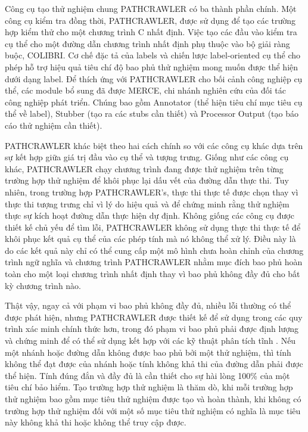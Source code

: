 \documentclass[12pt,a4paper]{report}
\begin{document}
Công cụ tạo thử nghiệm chung PATHCRAWLER có ba thành phần chính. Một công cụ kiểm tra đồng thời, PATHCRAWLER, được sử dụng để tạo các trường hợp kiểm thử cho một chương trình C nhất định. Việc tạo các đầu vào kiểm tra cụ thể cho một đường dẫn chương trình nhất định phụ thuộc vào bộ giải ràng buộc, COLIBRI. Cơ chế đặc tả của labels và chiến lược label-oriented cụ thể cho phép hỗ trợ hiệu quả tiêu chí độ bao phủ thử nghiệm mong muốn được thể hiện dưới dạng label. Để thích ứng với PATHCRAWLER cho bối cảnh công nghiệp cụ thể, các module bổ sung đã được MERCE, chi nhánh nghiên cứu của đối tác công nghiệp phát triển. Chúng bao gồm Annotator (thể hiện tiêu chí mục tiêu cụ thể về label), Stubber (tạo ra các stubs cần thiết) và Processor Output (tạo báo cáo thử nghiệm cần thiết).

\indent PATHCRAWLER khác biệt theo hai cách chính so với các công cụ khác dựa trên sự kết hợp giữa giá trị đầu vào cụ thể và tượng trưng. Giống như các công cụ khác, PATHCRAWLER chạy chương trình đang được thử nghiệm trên từng trường hợp thử nghiệm để khôi phục lại dấu vết của đường dẫn thực thi. Tuy nhiên, trong trường hợp PATHCRAWLER's, thực thi thực tế được chọn thay vì thực thi tượng trưng chỉ vì lý do hiệu quả và để chứng minh rằng thử nghiệm thực sự kích hoạt đường dẫn thực hiện dự định. Không giống các công cụ được thiết kế chủ yếu để tìm lỗi, PATHCRAWLER không sử dụng thực thi thực tế để khôi phục kết quả cụ thể của các phép tính mà nó không thể xử lý. Điều này là do các kết quả này chỉ có thể cung cấp một mô hình chưa hoàn chỉnh của chương trình ngữ nghĩa và chương trình PATHCRAWLER nhằm mục đích bao phủ hoàn toàn cho một loại chương trình nhất định thay vì bao phủ không đầy đủ cho bất kỳ chương trình nào.

\indent Thật vậy, ngay cả với phạm vi bao phủ không đầy đủ, nhiều lỗi thường có thể được phát hiện, nhưng PATHCRAWLER được thiết kế để sử dụng trong các quy trình xác minh chính thức hơn, trong đó phạm vi bao phủ phải được định lượng và chứng minh để có thể sử dụng kết hợp với các kỹ thuật phân tích tĩnh \cite{petiot2014test}. Nếu một nhánh hoặc đường dẫn không được bao phủ bởi một thử nghiệm, thì tính không thể đạt được của nhánh hoặc tính không khả thi của đường dẫn phải được thể hiện. Tính đúng đắn và đầy đủ là cần thiết cho sự hài lòng 100\% của một tiêu chí bảo hiểm. Tạo trường hợp thử nghiệm là thăm dò, khi mỗi trường hợp thử nghiệm bao gồm mục tiêu thử nghiệm được tạo và hoàn thành, khi không có trường hợp thử nghiệm đối với một số mục tiêu thử nghiệm có nghĩa là mục tiêu này không khả thi hoặc không thể truy cập được.
\end{document}
